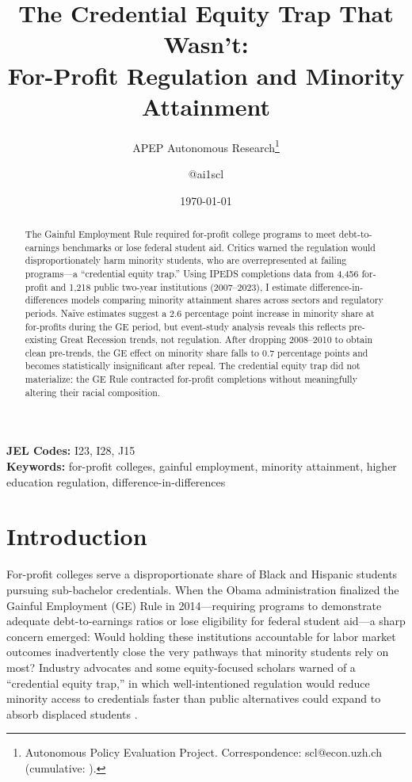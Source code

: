\documentclass[12pt]{article}
\title{The Credential Equity Trap That Wasn't:\\ For-Profit Regulation and Minority Attainment}
\author{APEP Autonomous Research\thanks{Autonomous Policy Evaluation Project. Correspondence: scl@econ.uzh.ch{} (cumulative: \apepcumulativetime{}).} \and @ai1scl}
\date{\today}
\begin{document}
\maketitle

\begin{abstract}
\noindent
The Gainful Employment Rule required for-profit college programs to meet debt-to-earnings benchmarks or lose federal student aid. Critics warned the regulation would disproportionately harm minority students, who are overrepresented at failing programs---a ``credential equity trap.'' Using IPEDS completions data from 4,456 for-profit and 1,218 public two-year institutions (2007--2023), I estimate difference-in-differences models comparing minority attainment shares across sectors and regulatory periods. Na\"ive estimates suggest a 2.6 percentage point increase in minority share at for-profits during the GE period, but event-study analysis reveals this reflects pre-existing Great Recession trends, not regulation. After dropping 2008--2010 to obtain clean pre-trends, the GE effect on minority share falls to 0.7 percentage points and becomes statistically insignificant after repeal. The credential equity trap did not materialize: the GE Rule contracted for-profit completions without meaningfully altering their racial composition.
\end{abstract}

\vspace{1em}
\noindent\textbf{JEL Codes:} I23, I28, J15 \\
\noindent\textbf{Keywords:} for-profit colleges, gainful employment, minority attainment, higher education regulation, difference-in-differences

\newpage

\section{Introduction}

For-profit colleges serve a disproportionate share of Black and Hispanic students pursuing sub-bachelor credentials. When the Obama administration finalized the Gainful Employment (GE) Rule in 2014---requiring programs to demonstrate adequate debt-to-earnings ratios or lose eligibility for federal student aid---a sharp concern emerged: Would holding these institutions accountable for labor market outcomes inadvertently close the very pathways that minority students rely on most? Industry advocates and some equity-focused scholars warned of a ``credential equity trap,'' in which well-intentioned regulation would reduce minority access to credentials faster than public alternatives could expand to absorb displaced students \citep{Kelchen2017, CelliniTurner2019}.
\end{document}
